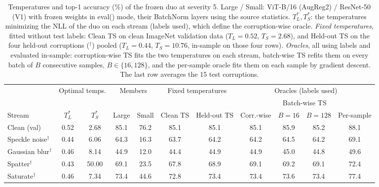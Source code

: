 \begin{table}[t]
    \centering
    \small
    \setlength{\tabcolsep}{4.5pt}
    \caption{Temperatures and top-1 accuracy (\%) of the frozen duo at severity 5. Large / Small: ViT-B/16 (AugReg2) / ResNet-50 (V1) with frozen weights in eval() mode, their BatchNorm layers using the source statistics. $T_L^*, T_S^*$: the temperatures minimizing the NLL of the duo on each stream (labels used), which define the corruption-wise oracle. \emph{Fixed temperatures}, fitted without test labels: Clean TS on clean ImageNet validation data ($T_L = 0.52$, $T_S = 2.68$), and Held-out TS on the four held-out corruptions ($^\dagger$) pooled ($T_L = 0.44$, $T_S = 10.76$, in-sample on those four rows). \emph{Oracles}, all using labels and evaluated in-sample: corruption-wise TS fits the two temperatures on each stream, batch-wise TS refits them on every batch of $B$ consecutive samples, $B \in \{16, 128\}$, and the per-sample oracle fits them on each sample by gradient descent. The last row averages the 15 test corruptions.}
    \label{tab:temperatures:frozen__vitb16aug2_rn50v1}
    \label{tab:oracles:frozen__vitb16aug2_rn50v1}
    \begin{tabular}{l|cc|cc|cc|cccc}
        \toprule
        & \multicolumn{2}{c|}{Optimal temps.} & \multicolumn{2}{c|}{Members} & \multicolumn{2}{c|}{Fixed temperatures} & \multicolumn{4}{c}{Oracles (labels used)} \\
         &  &  &  &  &  &  &  & \multicolumn{2}{c}{Batch-wise TS} &  \\
        \cmidrule(lr){9-10}
        Stream & $T_L^*$ & $T_S^*$ & Large & Small & Clean TS & Held-out TS & Corr.-wise & $B{=}16$ & $B{=}128$ & Per-sample \\
        \midrule
        Clean (val) & 0.52 & 2.68 & 85.1 & 76.2 & 85.1 & 85.1 & 85.1 & 85.9 & 85.2 & 88.1 \\
        \midrule
        Speckle noise$^\dagger$ & 0.44 & 6.06 & 64.3 & 16.3 & 63.7 & 64.2 & 64.2 & 64.5 & 64.2 & 69.1 \\
        Gaussian blur$^\dagger$ & 0.46 & 8.14 & 44.9 & 12.0 & 44.4 & 44.9 & 44.9 & 45.0 & 44.8 & 49.6 \\
        Spatter$^\dagger$ & 0.43 & 50.00 & 69.1 & 23.5 & 67.8 & 68.9 & 69.1 & 69.2 & 69.1 & 72.4 \\
        Saturate$^\dagger$ & 0.46 & 7.34 & 73.4 & 44.6 & 72.8 & 73.4 & 73.4 & 73.6 & 73.4 & 77.4 \\
        \midrule

\end{tabular}
\end{table}
